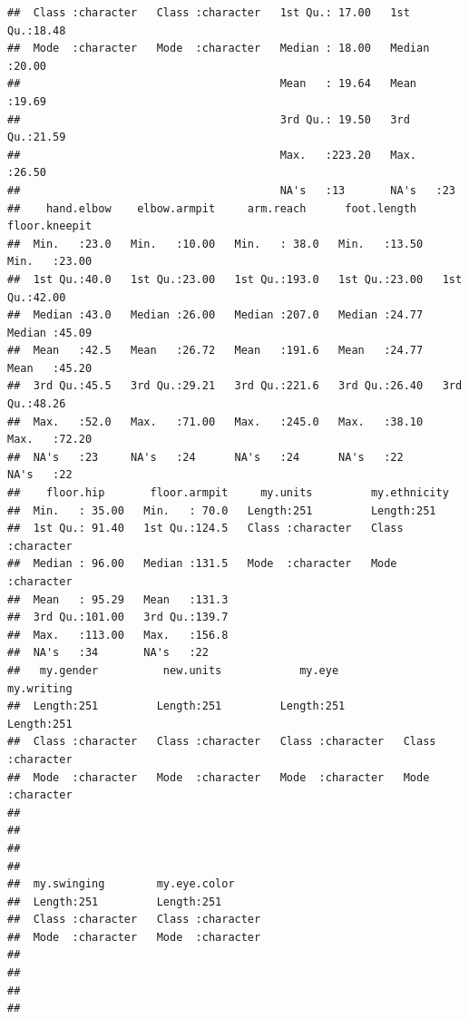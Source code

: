 \documentclass[]{article}
\begin{document}
\begin{verbatim}
##  Class :character   Class :character   1st Qu.: 17.00   1st Qu.:18.48  
##  Mode  :character   Mode  :character   Median : 18.00   Median :20.00  
##                                        Mean   : 19.64   Mean   :19.69  
##                                        3rd Qu.: 19.50   3rd Qu.:21.59  
##                                        Max.   :223.20   Max.   :26.50  
##                                        NA's   :13       NA's   :23     
##    hand.elbow    elbow.armpit     arm.reach      foot.length    floor.kneepit  
##  Min.   :23.0   Min.   :10.00   Min.   : 38.0   Min.   :13.50   Min.   :23.00  
##  1st Qu.:40.0   1st Qu.:23.00   1st Qu.:193.0   1st Qu.:23.00   1st Qu.:42.00  
##  Median :43.0   Median :26.00   Median :207.0   Median :24.77   Median :45.09  
##  Mean   :42.5   Mean   :26.72   Mean   :191.6   Mean   :24.77   Mean   :45.20  
##  3rd Qu.:45.5   3rd Qu.:29.21   3rd Qu.:221.6   3rd Qu.:26.40   3rd Qu.:48.26  
##  Max.   :52.0   Max.   :71.00   Max.   :245.0   Max.   :38.10   Max.   :72.20  
##  NA's   :23     NA's   :24      NA's   :24      NA's   :22      NA's   :22     
##    floor.hip       floor.armpit     my.units         my.ethnicity      
##  Min.   : 35.00   Min.   : 70.0   Length:251         Length:251        
##  1st Qu.: 91.40   1st Qu.:124.5   Class :character   Class :character  
##  Median : 96.00   Median :131.5   Mode  :character   Mode  :character  
##  Mean   : 95.29   Mean   :131.3                                        
##  3rd Qu.:101.00   3rd Qu.:139.7                                        
##  Max.   :113.00   Max.   :156.8                                        
##  NA's   :34       NA's   :22                                           
##   my.gender          new.units            my.eye           my.writing       
##  Length:251         Length:251         Length:251         Length:251        
##  Class :character   Class :character   Class :character   Class :character  
##  Mode  :character   Mode  :character   Mode  :character   Mode  :character  
##                                                                             
##                                                                             
##                                                                             
##                                                                             
##  my.swinging        my.eye.color      
##  Length:251         Length:251        
##  Class :character   Class :character  
##  Mode  :character   Mode  :character  
##                                       
##                                       
##                                       
## 
\end{verbatim}
\end{document}
